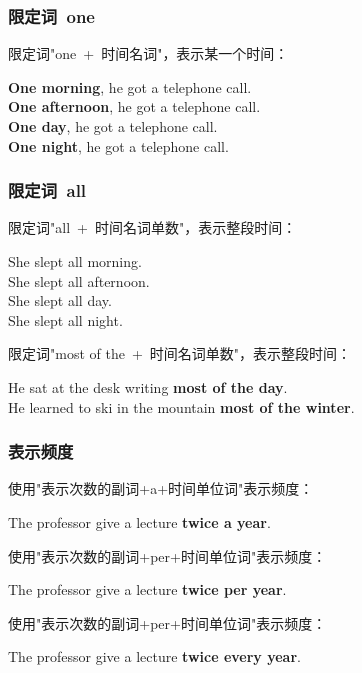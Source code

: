 \documentclass[UTF8]{ctexart}
\newcommand{\littf}[1]{{\hspace{3pt}\ttfamily #1}}
\begin{document}
\newpage

\subsubsection{限定词~\littf{one}}
    限定词\littf{"one~+~时间名词"}，表示某一个时间：
    \begin{center}
        \large\ttfamily
        \textbf{One morning}, he got a telephone call.\\[3mm]
        \textbf{One afternoon}, he got a telephone call.\\[3mm]
        \textbf{One day}, he got a telephone call.\\[3mm]
        \textbf{One night}, he got a telephone call.
    \end{center}\vspace{15pt}

\subsubsection{限定词~\littf{all}}
    限定词\littf{"all~+~时间名词单数"}，表示整段时间：
    \begin{center}
        \large\ttfamily
        She slept {all morning}.\\[3mm]
        She slept {all afternoon}.\\[3mm]
        She slept {all day}.\\[3mm]
        She slept {all night}.\\[6mm]
    \end{center}
    限定词\littf{"most of the~+~时间名词单数"}，表示整段时间：
    \begin{center}
        \large\ttfamily
        He sat at the desk writing \textbf{most of the day}.\\[3mm]
        He learned to ski in the mountain \textbf{most of the winter}.
    \end{center}\vspace{15pt}

\subsubsection{表示频度}
    使用\littf{"表示次数的副词+a+时间单位词"}表示频度：
    \begin{center}
        \large\ttfamily
        The professor give a lecture \textbf{twice a year}.\\[6mm]
    \end{center}
    使用\littf{"表示次数的副词+per+时间单位词"}表示频度：
    \begin{center}
        \large\ttfamily
        The professor give a lecture \textbf{twice per year}.\\[6mm]
    \end{center}
    使用\littf{"表示次数的副词+per+时间单位词"}表示频度：
    \begin{center}
        \large\ttfamily
        The professor give a lecture \textbf{twice every year}.
    \end{center}
\end{document}
